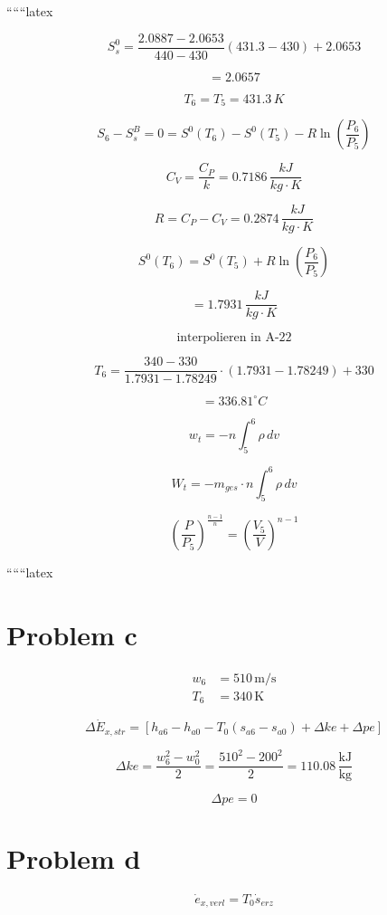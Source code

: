 ``````latex

\[
S_s^0 = \frac{2.0887 - 2.0653}{440 - 430} (431.3 - 430) + 2.0653
\]

\[
= 2.0657
\]

\[
T_6 = T_5 = 431.3 \, K
\]

\[
S_6 - S_s^B = 0 = S^0(T_6) - S^0(T_5) - R \ln \left( \frac{P_6}{P_5} \right)
\]

\[
C_V = \frac{C_P}{k} = 0.7186 \, \frac{kJ}{kg \cdot K}
\]

\[
R = C_P - C_V = 0.2874 \, \frac{kJ}{kg \cdot K}
\]

\[
S^0(T_6) = S^0(T_5) + R \ln \left( \frac{P_6}{P_5} \right)
\]

\[
= 1.7931 \, \frac{kJ}{kg \cdot K}
\]

\[
\text{interpolieren in A-22}
\]

\[
T_6 = \frac{340 - 330}{1.7931 - 1.78249} \cdot (1.7931 - 1.78249) + 330
\]

\[
= 336.81^\circ C
\]

\[
w_t = -n \int_5^6 \rho \, dv
\]

\[
W_t = -m_{ges} \cdot n \int_5^6 \rho \, dv
\]

\[
\left( \frac{P}{P_5} \right)^{\frac{n-1}{n}} = \left( \frac{V_5}{V} \right)^{n-1}
\]

``````latex


\section*{Problem c}

\begin{align*}
    w_6 &= 510 \, \text{m/s} \\
    T_6 &= 340 \, \text{K}
\end{align*}

\[
\Delta \dot{E}_{x,str} = \left[ h_{a6} - h_{a0} - T_0 \left( s_{a6} - s_{a0} \right) + \Delta ke + \Delta pe \right]
\]

\[
\Delta ke = \frac{w_6^2 - w_0^2}{2} = \frac{510^2 - 200^2}{2} = 110.08 \, \frac{\text{kJ}}{\text{kg}}
\]

\[
\Delta pe = 0
\]

\section*{Problem d}

\[
\dot{e}_{x,verl} = T_0 \dot{s}_{erz}
\]


